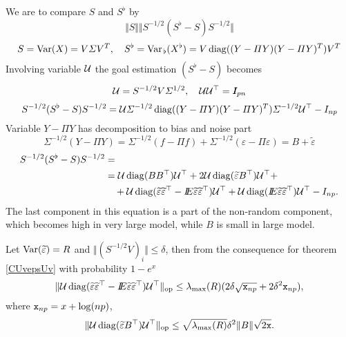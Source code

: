 We are to compare $S$ and $S^{\flat}$ by 
\[
\Vert S \Vert \Vert S^{-1/2} (S^{\flat} - S) S^{-1/2} \Vert
\]
\[
S = \operatorname{Var} (X) = V \varSigma V^T, 
\quad
S^{\flat} = \operatorname{Var}_{\hspace{1pt} \flat} (X^{\flat}) = V \operatorname{diag}((Y - \varPi Y)  (Y - \varPi Y)^T ) V^T
\]
Involving variable $\mathcal{U}$ the goal estimation $(S^{\flat} - S)$ becomes
\[
\mathcal{U} = S^{-1/2} V \varSigma^{1/2},
\quad
\mathcal{U}\mathcal{U}^{\top} = I\!\!\!I_{pn}
\]
\[
S^{-1/2} (S^{\flat} - S) S^{-1/2} =  \mathcal{U} \varSigma^{-1/2} \operatorname{diag}((Y - \varPi Y)  (Y - \varPi Y)^T ) \varSigma^{-1/2} \mathcal{U}^{\top} - I_{np}
\]
Variable $Y - \Pi Y$ has decomposition to bias and noise part 
\[
\Sigma^{-1/2}(Y - \Pi Y) = \Sigma^{-1/2}(f - \Pi f) + \Sigma^{-1/2}(\varepsilon - \Pi \varepsilon) = B + \tilde{\varepsilon}   
\] 
\begin{align*}
S^{-1/2} (S^{\flat} - S) S^{-1/2} &=\\
 &=\mathcal{U} \operatorname{diag}(BB^{\top})\mathcal{U}^{\top} + 2\mathcal{U} \operatorname{diag}(\widetilde{\varepsilon}B^{\top})\mathcal{U}^{\top} +\\
 &\quad+ \mathcal{U} \operatorname{diag}(\widetilde{\varepsilon}\widetilde{\varepsilon}^{\top}  -  I\!\!E \widetilde{\varepsilon}\widetilde{\varepsilon}^{\top}) \mathcal{U}^{\top} + \mathcal{U} \operatorname{diag}(I\!\!E \widetilde{\varepsilon}\widetilde{\varepsilon}^{\top}) \mathcal{U}^{\top}  - I_{np}.
\end{align*}
The last component in this equation is a part of the non-random component, which becomes high in very large model, while  $B$ is small in large model.

Let $\operatorname{Var} (\widetilde{\varepsilon}) = R$ and $\Vert (S^{-1/2} V)_i \Vert \leq \delta$, then from the consequence for theorem \ref{CUvepsUv} with probability $1 - e^x$
\[
\Vert \mathcal{U} \operatorname{diag}(\widetilde{\varepsilon}\widetilde{\varepsilon}^{\top}  -  I\!\!E \widetilde{\varepsilon}\widetilde{\varepsilon}^{\top}) \mathcal{U}^{\top} \Vert_{\operatorname{op}}
\leq  \lambda_{\max}(R) (  2 \delta \sqrt{\mathtt{x}_{np}} + 2 \delta^{2} \mathtt{x}_{np} ),
\] 
where $\mathtt{x}_{np} = x + \log(np)$, 
\[
\Vert \mathcal{U} \operatorname{diag}(\widetilde{\varepsilon}B^{\top}) \mathcal{U}^{\top} \Vert_{\operatorname{op}} 
\leq \sqrt{\lambda_{\max}(R)} \delta^{2} \| B \| \sqrt{2 \mathtt{x}}.
\]

